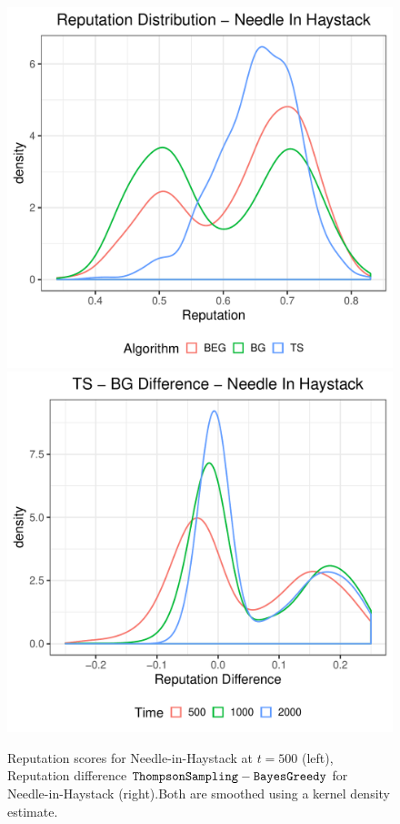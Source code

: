 \documentclass[../competing_bandits_with_appendix.tex]{subfiles}
\begin{document}
\begin{figure}[ht]
\centering
\includegraphics[scale=0.35]{ec19paper/figures/rep_distribution_nih}
\includegraphics[scale=0.35]{ec19paper/figures/ts_dg_rep_diff_nih}
\caption{Reputation scores for Needle-in-Haystack at $t=500$ (left), Reputation difference $\mathtt{ThompsonSampling} - \mathtt{BayesGreedy}$ for Needle-in-Haystack (right).Both are smoothed using a kernel density estimate.}
\label{fig:rep_dist_nih}
\end{figure}
\end{document}
